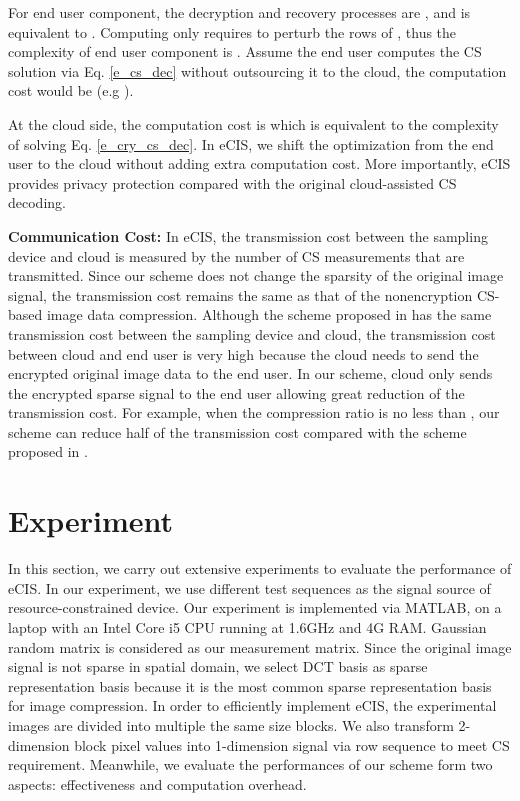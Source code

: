 \documentclass[conference]{IEEEtran}
\begin{document}
For end user component, the decryption and recovery processes are , and  is equivalent to . Computing  only requires to perturb the rows of  , thus the complexity of end user component is  . Assume  the end user computes  the CS solution via Eq. \ref{e_cs_dec} without outsourcing it to the cloud, the computation cost would be  (e.g \cite{OMP}).

At the cloud side, the computation  cost is  which is equivalent to the complexity of  solving  Eq. \ref{e_cry_cs_dec}. In  eCIS, we shift the  optimization from the end user to the cloud without adding extra computation cost. More importantly, eCIS provides privacy protection  compared with the original cloud-assisted CS decoding.

\textbf{Communication Cost:} In eCIS, the transmission cost between the sampling device and cloud is measured by  the number of CS measurements that are transmitted. Since our scheme does not change the sparsity of the original image signal,  the transmission cost remains the same as that of the nonencryption CS-based image data compression. Although the scheme proposed in  \cite{wang2014privacy} has the same transmission cost between the sampling device and cloud, the transmission cost between cloud and end user is very high because the cloud needs to send the encrypted original image data to the end user. In our scheme, cloud only sends the encrypted sparse signal to the end user allowing great reduction of  the transmission cost. For example, when  the compression ratio is no less than  , our scheme can reduce half of the transmission cost compared with the scheme proposed in \cite{wang2014privacy}.


\section{Experiment}
In this section, we carry out extensive experiments to evaluate the performance of eCIS. In our experiment, we use different test sequences as the signal source of resource-constrained device. Our experiment is implemented via MATLAB, on a laptop with an Intel Core i5 CPU running at 1.6GHz and 4G RAM. Gaussian random matrix  is considered as our measurement matrix. Since the original image signal is not sparse in spatial domain, we select DCT basis as sparse representation basis because it is the most common sparse representation basis for image compression. In order to efficiently implement eCIS, the experimental images are divided into multiple the same size blocks. We also transform 2-dimension block pixel values into 1-dimension signal via row sequence to meet CS requirement.
Meanwhile, we evaluate the performances of our scheme form two aspects: effectiveness and computation overhead.
\end{document}
